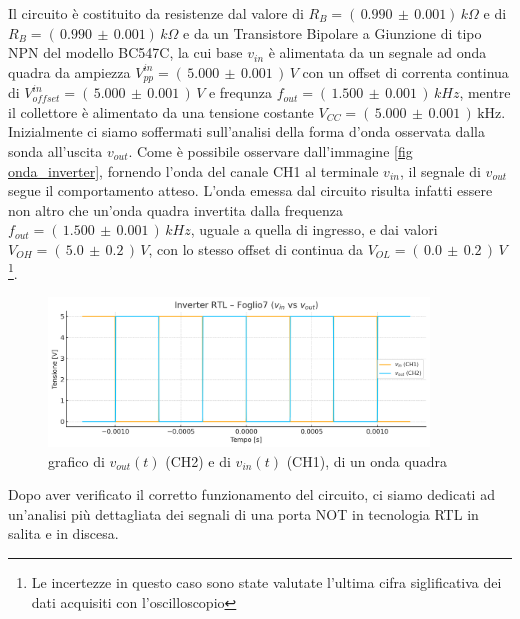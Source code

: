 \documentclass[a4paper,12pt]{article}
\begin{document}
Il circuito è costituito da resistenze dal valore di \(R_B = (\,0.990\,\pm\, 0.001 )\, k\Omega\) e di \(R_B = (\,0.990\,\pm\, 0.001 )\, k\Omega\) e da un Transistore Bipolare a Giunzione di tipo NPN del modello BC547C, la cui base \(v_{in}\) è alimentata da un segnale ad onda quadra da ampiezza \(V_{pp}^{in} = (\,5.000 \,\pm\, 0.001\,)\, V\) con un offset di correnta continua di \(V_{offset}^{in} = (\,5.000\, \pm \,0.001\,)\, V\) e frequnza \(f_{out}= (\,1.500\, \pm\, 0.001\, )\, kHz \), mentre il collettore è alimentato da una tensione costante \(V_{CC}=(\,5.000\, \pm\, 0.001\, )\, \mathrm{kHz} \).
Inizialmente ci siamo soffermati sull'analisi della forma d'onda osservata dalla sonda all'uscita \(v_{out}\). Come è possibile osservare dall'immagine \ref{fig onda_inverter}, fornendo l'onda del canale CH1 al terminale \(v_{in}\), il segnale di \(v_{out}\) segue il comportamento atteso. L'onda emessa dal circuito risulta infatti essere non altro che un'onda quadra invertita dalla frequenza \(f_{out}= (\,1.500\, \pm\, 0.001\, )\, kHz \), uguale a quella di ingresso, e dai valori \(V_{OH} = (\,5.0\, \pm\, 0.2\,)\,V\), con lo stesso offset di continua da \(V_{OL} = (\,0.0 \,\pm\,0.2\,)\,V\)\footnote{Le incertezze in questo caso sono state valutate l'ultima cifra siglificativa dei dati acquisiti con l'oscilloscopio }. 
\begin{figure}[ht]
  \centering
  \includegraphics[width=0.9\textwidth]{onda_quadra.png}
  \caption{grafico di $v_{out}(t)$ (CH2) e di $v_{in}(t)$ (CH1), di un onda quadra}
  \label{fig:derivatore_sin}
\end{figure}

Dopo aver verificato il corretto funzionamento del circuito, ci siamo dedicati ad un'analisi più dettagliata dei segnali di una porta NOT in tecnologia RTL in salita e in discesa.
\end{document}
